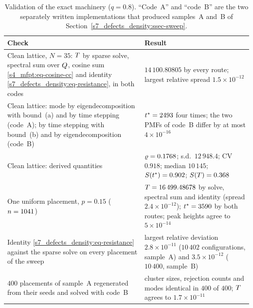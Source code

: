 \begin{table}[tbp]
\centering\small
\caption{Validation of the exact machinery ($q=0.8$). ``Code~A'' and ``code~B'' are the two separately written
implementations that produced samples~A and~B of Section~\ref{s7_defects_density:ssec-sweep}.}
\label{s7_defects_density:tab-validation}
\begin{tabular}{@{}p{}p{}@{}}
\toprule
Check & Result \\
\midrule
Clean lattice, $N=35$: $T$ by sparse solve, spectral sum over $Q$, cosine sum \eqref{s4_mfpt:eq-cosine-cc} and
identity \eqref{s7_defects_density:eq-resistance}, in both codes
 & $14\,100.80805$ by every route; largest relative spread $1.5\times10^{-12}$ \\
Clean lattice: mode by eigendecomposition with bound~(a) and by time stepping (code~A); by time stepping with
bound~(b) and by eigendecomposition (code~B)
 & $t^{*}=2493$ four times; the two PMFs of code~B differ by at most $4\times10^{-16}$ \\
Clean lattice: derived quantities
 & $\varrho=0.1768$; s.d.\ $12\,948.4$; CV $0.918$; median $10\,145$; $S(t^{*})=0.902$; $S(T)=0.368$ \\
One uniform placement, $p=0.15$ ($n=1041$)
 & $T=16\,499.48678$ by solve, spectral sum and identity (spread $2.4\times10^{-12}$); $t^{*}=3590$ by both routes;
 peak heights agree to $5\times10^{-14}$ \\
Identity \eqref{s7_defects_density:eq-resistance} against the sparse solve on every placement of the sweep
 & largest relative deviation $2.8\times10^{-11}$ ($10\,402$ configurations, sample~A) and $3.5\times10^{-12}$
 ($10\,400$, sample~B) \\
$400$ placements of sample~A regenerated from their seeds and solved with code~B
 & cluster sizes, rejection counts and modes identical in $400$ of $400$; $T$ agrees to $1.7\times10^{-11}$ \\

\end{tabular}
\end{table}

